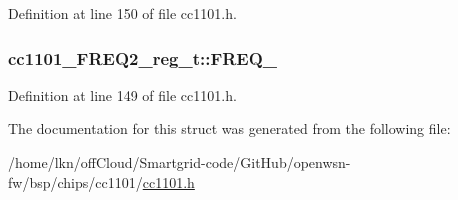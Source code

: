 Definition at line 150 of file cc1101.\+h.

\subsubsection[{\texorpdfstring{F\+R\+E\+Q\+\_\+2}{FREQ_2}}]{ cc1101\+\_\+\+F\+R\+E\+Q2\+\_\+reg\+\_\+t\+::\+F\+R\+E\+Q\+\_}\hypertarget{structcc1101___f_r_e_q2__reg__t_a564233e5b8ae12e6400e71713ff1a378}{}\label{structcc1101___f_r_e_q2__reg__t_a564233e5b8ae12e6400e71713ff1a378}


Definition at line 149 of file cc1101.\+h.



The documentation for this struct was generated from the following file\+:\begin{DoxyCompactItemize}
\item 
/home/lkn/off\+Cloud/\+Smartgrid-\/code/\+Git\+Hub/openwsn-\/fw/bsp/chips/cc1101/\hyperlink{cc1101_8h}{cc1101.\+h}\end{DoxyCompactItemize}
